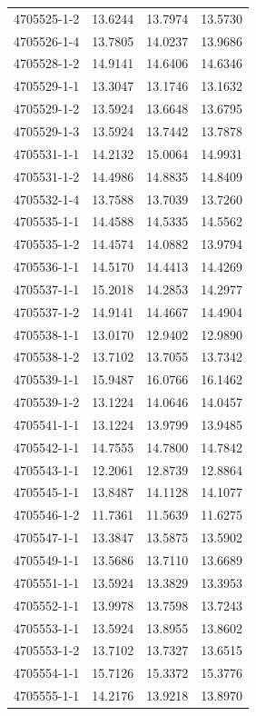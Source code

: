 \begin{longtable}{lrrr}
4705525-1-2 & 13.6244 & 13.7974 & 13.5730 \\
4705526-1-4 & 13.7805 & 14.0237 & 13.9686 \\
4705528-1-2 & 14.9141 & 14.6406 & 14.6346 \\
4705529-1-1 & 13.3047 & 13.1746 & 13.1632 \\
4705529-1-2 & 13.5924 & 13.6648 & 13.6795 \\
4705529-1-3 & 13.5924 & 13.7442 & 13.7878 \\
4705531-1-1 & 14.2132 & 15.0064 & 14.9931 \\
4705531-1-2 & 14.4986 & 14.8835 & 14.8409 \\
4705532-1-4 & 13.7588 & 13.7039 & 13.7260 \\
4705535-1-1 & 14.4588 & 14.5335 & 14.5562 \\
4705535-1-2 & 14.4574 & 14.0882 & 13.9794 \\
4705536-1-1 & 14.5170 & 14.4413 & 14.4269 \\
4705537-1-1 & 15.2018 & 14.2853 & 14.2977 \\
4705537-1-2 & 14.9141 & 14.4667 & 14.4904 \\
4705538-1-1 & 13.0170 & 12.9402 & 12.9890 \\
4705538-1-2 & 13.7102 & 13.7055 & 13.7342 \\
4705539-1-1 & 15.9487 & 16.0766 & 16.1462 \\
4705539-1-2 & 13.1224 & 14.0646 & 14.0457 \\
4705541-1-1 & 13.1224 & 13.9799 & 13.9485 \\
4705542-1-1 & 14.7555 & 14.7800 & 14.7842 \\
4705543-1-1 & 12.2061 & 12.8739 & 12.8864 \\
4705545-1-1 & 13.8487 & 14.1128 & 14.1077 \\
4705546-1-2 & 11.7361 & 11.5639 & 11.6275 \\
4705547-1-1 & 13.3847 & 13.5875 & 13.5902 \\
4705549-1-1 & 13.5686 & 13.7110 & 13.6689 \\
4705551-1-1 & 13.5924 & 13.3829 & 13.3953 \\
4705552-1-1 & 13.9978 & 13.7598 & 13.7243 \\
4705553-1-1 & 13.5924 & 13.8955 & 13.8602 \\
4705553-1-2 & 13.7102 & 13.7327 & 13.6515 \\
4705554-1-1 & 15.7126 & 15.3372 & 15.3776 \\
4705555-1-1 & 14.2176 & 13.9218 & 13.8970 \\

\end{longtable}
